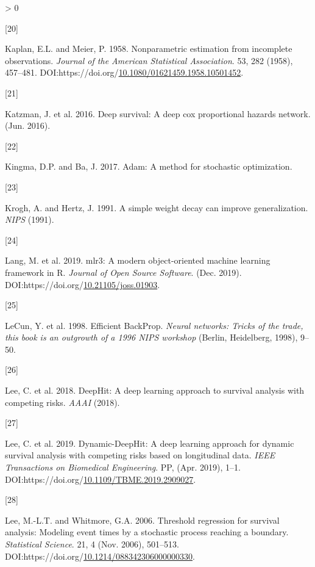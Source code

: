 \documentclass[
]{article}
\newlength{\cslhangindent}
\newlength{\csllabelwidth}
\newenvironment{CSLReferences}[2] %
 {%
  \setlength{\parindent}{0pt}
  \ifodd #1 \everypar{\setlength{\hangindent}{\cslhangindent}}\ignorespaces\fi
  \ifnum #2 > 0
  \setlength{\parskip}{#2\baselineskip}
  \fi
 }%
 {}
\newcommand{\CSLLeftMargin}[1]{\parbox[t]{\csllabelwidth}{#1}}
\newcommand{\CSLRightInline}[1]{\parbox[t]{\linewidth - \csllabelwidth}{#1}\break}
\begin{document}
\begin{CSLReferences}{0}{0}
\leavevmode\hypertarget{ref-kaplan-meier}{}%
\CSLLeftMargin{{[}20{]} }
\CSLRightInline{Kaplan, E.L. and Meier, P. 1958. Nonparametric estimation from incomplete observations. \emph{Journal of the American Statistical Association}. 53, 282 (1958), 457--481. DOI:https://doi.org/\href{https://doi.org/10.1080/01621459.1958.10501452}{10.1080/01621459.1958.10501452}.}

\leavevmode\hypertarget{ref-Katzman-et-al-2016}{}%
\CSLLeftMargin{{[}21{]} }
\CSLRightInline{Katzman, J. et al. 2016. Deep survival: A deep cox proportional hazards network. (Jun. 2016).}

\leavevmode\hypertarget{ref-adam-optimizer}{}%
\CSLLeftMargin{{[}22{]} }
\CSLRightInline{Kingma, D.P. and Ba, J. 2017. Adam: A method for stochastic optimization.}

\leavevmode\hypertarget{ref-wdr}{}%
\CSLLeftMargin{{[}23{]} }
\CSLRightInline{Krogh, A. and Hertz, J. 1991. A simple weight decay can improve generalization. \emph{NIPS} (1991).}

\leavevmode\hypertarget{ref-mlr3}{}%
\CSLLeftMargin{{[}24{]} }
\CSLRightInline{Lang, M. et al. 2019. {mlr3}: A modern object-oriented machine learning framework in {R}. \emph{Journal of Open Source Software}. (Dec. 2019). DOI:https://doi.org/\href{https://doi.org/10.21105/joss.01903}{10.21105/joss.01903}.}

\leavevmode\hypertarget{ref-efficient-backprop}{}%
\CSLLeftMargin{{[}25{]} }
\CSLRightInline{LeCun, Y. et al. 1998. Efficient BackProp. \emph{Neural networks: Tricks of the trade, this book is an outgrowth of a 1996 NIPS workshop} (Berlin, Heidelberg, 1998), 9--50.}

\leavevmode\hypertarget{ref-deephit}{}%
\CSLLeftMargin{{[}26{]} }
\CSLRightInline{Lee, C. et al. 2018. DeepHit: A deep learning approach to survival analysis with competing risks. \emph{AAAI} (2018).}

\leavevmode\hypertarget{ref-dynamic-deephit}{}%
\CSLLeftMargin{{[}27{]} }
\CSLRightInline{Lee, C. et al. 2019. Dynamic-DeepHit: A deep learning approach for dynamic survival analysis with competing risks based on longitudinal data. \emph{IEEE Transactions on Biomedical Engineering}. PP, (Apr. 2019), 1--1. DOI:https://doi.org/\href{https://doi.org/10.1109/TBME.2019.2909027}{10.1109/TBME.2019.2909027}.}

\leavevmode\hypertarget{ref-Lee_2006}{}%
\CSLLeftMargin{{[}28{]} }
\CSLRightInline{Lee, M.-L.T. and Whitmore, G.A. 2006. Threshold regression for survival analysis: Modeling event times by a stochastic process reaching a boundary. \emph{Statistical Science}. 21, 4 (Nov. 2006), 501--513. DOI:https://doi.org/\href{https://doi.org/10.1214/088342306000000330}{10.1214/088342306000000330}.}


\end{CSLReferences}
\end{document}
